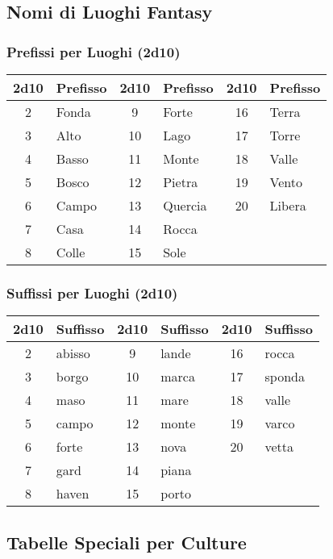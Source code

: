 \begin{multicols}{2}
{\subsection*{Nomi di Luoghi Fantasy}

\subsubsection*{Prefissi per Luoghi (2d10)}
\noindent\begin{tabular}{|c|l|c|l|c|l|}
	\hline
	\textbf{2d10} & \textbf{Prefisso} & \textbf{2d10} & \textbf{Prefisso} & \textbf{2d10} & \textbf{Prefisso} \\
	\hline
	2 & Fonda & 9 & Forte & 16 & Terra \\
	3 & Alto & 10 & Lago & 17 & Torre \\
	4 & Basso & 11 & Monte & 18 & Valle \\
	5 & Bosco & 12 & Pietra & 19 & Vento \\
	6 & Campo & 13 & Quercia & 20 & Libera \\
	7 & Casa & 14 & Rocca & & \\
	8 & Colle & 15 & Sole & & \\
	\hline
\end{tabular}

\subsubsection*{Suffissi per Luoghi (2d10)}

\noindent\begin{tabular}{|c|l|c|l|c|l|}
	\hline
	\textbf{2d10} & \textbf{Suffisso} & \textbf{2d10} & \textbf{Suffisso} & \textbf{2d10} & \textbf{Suffisso} \\
	\hline
	2 & abisso & 9 & lande & 16 & rocca \\
	3 & borgo & 10 & marca & 17 & sponda \\
	4 & maso & 11 & mare & 18 & valle \\
	5 & campo & 12 & monte & 19 & varco \\
	6 & forte & 13 & nova & 20 & vetta \\
	7 & gard & 14 & piana & & \\
	8 & haven & 15 & porto & & \\
	\hline
\end{tabular}



\subsection*{Tabelle Speciali per Culture}

}
\end{multicols}
